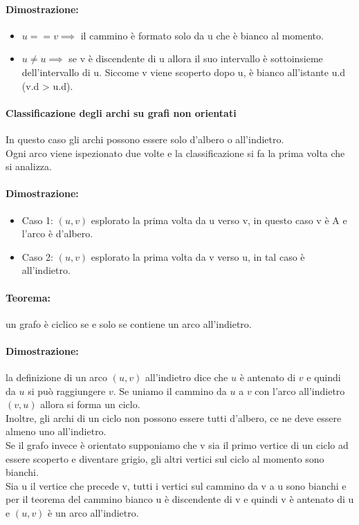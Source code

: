 \documentclass[a4paper,12pt]{article}
\begin{document}
\paragraph{Dimostrazione:}
\begin{itemize}
    \item $u == v \implies$ il cammino è formato solo da u che è bianco al momento.
    \item $u \ne u \implies$ se v è discendente di u allora il suo intervallo è sottoinsieme dell'intervallo di u. Siccome v viene scoperto dopo u, è bianco all'istante u.d (v.d > u.d).
\end{itemize}
\paragraph{Classificazione degli archi su grafi non orientati}
In questo caso gli archi possono essere solo d'albero o all'indietro.\\
Ogni arco viene ispezionato due volte e la classificazione si fa la prima volta che si analizza.\\
\paragraph{Dimostrazione:}
\begin{itemize}
    \item Caso 1: $(u,v)$ esplorato la prima volta da u verso v, in questo caso v è A e l'arco è d'albero.
    \item Caso 2: $(u,v)$ esplorato la prima volta da v verso u, in tal caso è all'indietro.
\end{itemize}
\paragraph{Teorema:} un grafo è ciclico se e solo se contiene un arco all'indietro.\\
\paragraph{Dimostrazione:} la definizione di un arco $(u,v)$ all'indietro dice che $u$ è antenato di $v$ e quindi da $u$ si può raggiungere $v$. Se uniamo il cammino da $u$ a $v$ con l'arco all'indietro $(v,u)$ allora si forma un ciclo.\\
Inoltre, gli archi di un ciclo non possono essere tutti d'albero, ce ne deve essere almeno uno all'indietro.\\
Se il grafo invece è orientato supponiamo che v sia il primo vertice di un ciclo ad essere scoperto e diventare grigio, gli altri vertici sul ciclo al momento sono bianchi.\\
Sia u il vertice che precede v, tutti i vertici sul cammino da v a u sono bianchi e per il teorema del cammino bianco u è discendente di v e quindi v è antenato di u e $(u,v)$ è un arco all'indietro.
\end{document}
